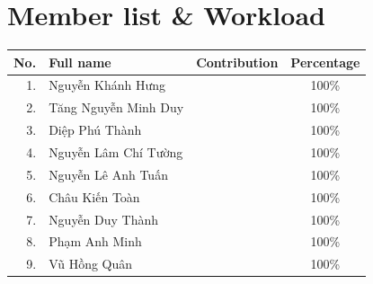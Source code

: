\section*{Member list \& Workload}

\begingroup
    \renewcommand{\arraystretch}{1.5}
    \begin{center}
        \begin{tabularx}{\textwidth}{|r|l|X|c|}
            \hline
            \textbf{No.} & \textbf{Full name} & \textbf{Contribution} & \textbf{Percentage} \\
            \hline
            \hline
            1. & Nguyễn Khánh Hưng        &  & 100\% \\ \hline
            2. & Tăng Nguyễn Minh Duy     &  & 100\% \\ \hline
            3. & Diệp Phú Thành           &  & 100\% \\ \hline
            4. & Nguyễn Lâm Chí Tường     &  & 100\% \\ \hline
            5. & Nguyễn Lê Anh Tuấn       &  & 100\% \\ \hline
            6. & Châu Kiến Toàn           &  & 100\% \\ \hline
            7. & Nguyễn Duy Thành         &  & 100\% \\ \hline
            8. & Phạm Anh Minh            &  & 100\% \\ \hline
            9. & Vũ Hồng Quân             &  & 100\% \\ \hline
        \end{tabularx}
    \end{center}
\endgroup
